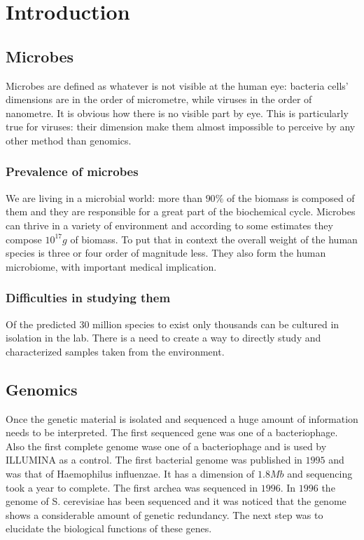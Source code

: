 \chapter{Introduction}

\section{Microbes}
Microbes are defined as whatever is not visible at the human eye: bacteria cells' dimensions are in the order of micrometre, while viruses in the order of nanometre.
It is obvious how there is no visible part by eye.
This is particularly true for viruses: their dimension make them almost impossible to perceive by any other method than genomics.

	\subsection{Prevalence of microbes}
	We are living in a microbial world: more than $90\%$ of the biomass is composed of them and they are responsible for a great part of the biochemical cycle.
	Microbes can thrive in a variety of environment and according to some estimates they compose $10^{17}g$ of biomass.
	To put that in context the overall weight of the human species is three or four order of magnitude less.
	They also form the human microbiome, with important medical implication.

	\subsection{Difficulties in studying them}
	Of the predicted $30$ million species to exist only thousands can be cultured in isolation in the lab.
	There is a need to create a way to directly study and characterized samples taken from the environment.

\section{Genomics}
Once the genetic material is isolated and sequenced a huge amount of information needs to be interpreted.
The first sequenced gene was one of a bacteriophage.
Also the first complete genome wase one of a bacteriophage and is used by ILLUMINA as a control.
The first bacterial genome was published in $1995$ and was that of Haemophilus influenzae.
It has a dimension of $1.8Mb$ and sequencing took a year to complete.
The first archea was sequenced in $1996$.
In $1996$ the genome of S. cerevisiae has been sequenced and it was noticed that the genome shows a considerable amount of genetic redundancy.
The next step was to elucidate the biological functions of these genes.

